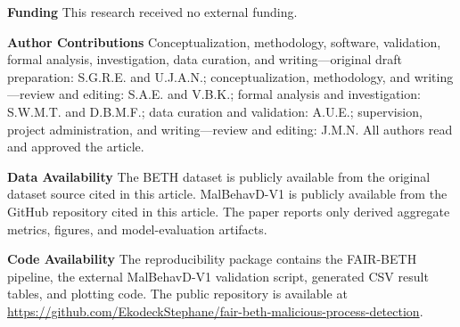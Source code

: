 \documentclass[10pt,journal,compsoc]{IEEEtran}
\begin{document}
\noindent
\begin{sloppypar}
\textbf{Funding} This research received no external funding.
\end{sloppypar}

\noindent
\begin{sloppypar}
\textbf{Author Contributions} Conceptualization, methodology, software, validation, formal analysis, investigation, data curation, and writing---original draft preparation: S.G.R.E. and U.J.A.N.; conceptualization, methodology, and writing---review and editing: S.A.E. and V.B.K.; formal analysis and investigation: S.W.M.T. and D.B.M.F.; data curation and validation: A.U.E.; supervision, project administration, and writing---review and editing: J.M.N. All authors read and approved the article.
\end{sloppypar}

\noindent
\begin{sloppypar}
\textbf{Data Availability} The BETH dataset is publicly available from the original dataset source cited in this article. MalBehavD-V1 is publicly available from the GitHub repository cited in this article. The paper reports only derived aggregate metrics, figures, and model-evaluation artifacts.
\end{sloppypar}

\noindent
\begin{sloppypar}
\textbf{Code Availability} The reproducibility package contains the FAIR-BETH pipeline, the external MalBehavD-V1 validation script, generated CSV result tables, and plotting code. The public repository is available at \url{https://github.com/EkodeckStephane/fair-beth-malicious-process-detection}.
\end{sloppypar}



\end{document}
